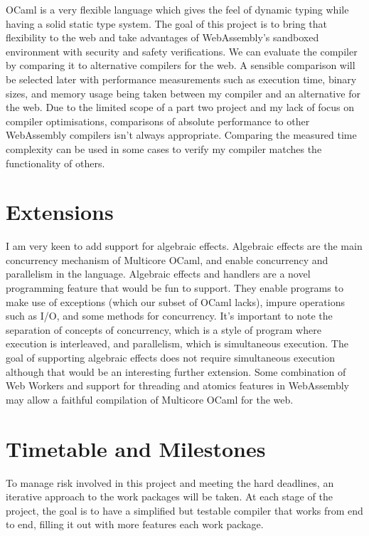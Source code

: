\documentclass[a4paper,12pt]{article}
\begin{document}
OCaml is a very flexible language which gives the feel of dynamic typing while having a solid static type system.
The goal of this project is to bring that flexibility to the web and take advantages of WebAssembly's sandboxed environment with security and safety verifications.
We can evaluate the compiler by comparing it to alternative compilers for the web.
A sensible comparison will be selected later with performance measurements such as execution time, binary sizes, and memory usage being taken between my compiler and an alternative for the web.
Due to the limited scope of a part two project and my lack of focus on compiler optimisations, comparisons of absolute performance to other WebAssembly compilers isn't always appropriate.
Comparing the measured time complexity can be used in some cases to verify my compiler matches the functionality of others.

\section{Extensions}

I am very keen to add support for algebraic effects.
Algebraic effects are the main concurrency mechanism of Multicore OCaml, and enable concurrency and parallelism in the language.
Algebraic effects and handlers are a novel programming feature that would be fun to support.
They enable programs to make use of exceptions (which our subset of OCaml lacks), impure operations such as I/O, and some methods for concurrency.
It's important to note the separation of concepts of concurrency, which is a style of program where execution is interleaved, and parallelism, which is simultaneous execution.
The goal of supporting algebraic effects does not require simultaneous execution although that would be an interesting further extension.
Some combination of Web Workers and support for threading and atomics features in WebAssembly may allow a faithful compilation of Multicore OCaml for the web.

\section{Timetable and Milestones}

To manage risk involved in this project and meeting the hard deadlines, an iterative approach to the work packages will be taken.
At each stage of the project, the goal is to have a simplified but testable compiler that works from end to end, filling it out with more features each work package.
\end{document}
